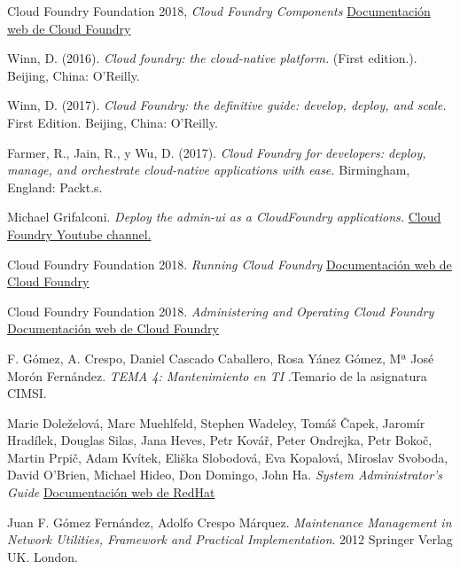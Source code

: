 \documentclass[a4paper,11pt]{article}
\begin{document}
\begin{thebibliography}{99}

Cloud Foundry Foundation 2018,
\textit{Cloud Foundry Components}
\href{https://docs.cloudfoundry.org/concepts/architecture/index.html}{Documentación web de Cloud Foundry}

Winn, D. (2016). \textit{Cloud foundry: the cloud-native platform.}
(First edition.). Beijing, China: O’Reilly.

Winn, D. (2017). \textit{Cloud Foundry: the definitive guide: develop, deploy, and scale.} First Edition. Beijing, China: O’Reilly.

Farmer, R., Jain, R., y Wu, D. (2017). \textit{Cloud Foundry for developers: deploy, manage, and orchestrate cloud-native applications with ease.} Birmingham, England: Packt.s.

Michael Grifalconi. \textit{Deploy the admin-ui as a CloudFoundry applications.}
\href{https://www.youtube.com/watch?v=9Np7swZN-4g}{Cloud Foundry Youtube channel.}

Cloud Foundry Foundation 2018.
\textit{Running Cloud Foundry}
\href{ https://docs.cloudfoundry.org/running/index.htm}{Documentación web de Cloud Foundry}

Cloud Foundry Foundation 2018.
\textit{Administering and Operating Cloud Foundry }
\href{https://docs.cloudfoundry.org/adminguide/}{Documentación web de Cloud Foundry}

F. Gómez, A. Crespo, Daniel Cascado Caballero, Rosa Yánez Gómez, Mª José Morón Fernández.
\textit{TEMA 4: Mantenimiento en TI}
.Temario de la asignatura CIMSI.

Marie Doleželová, Marc Muehlfeld, Stephen Wadeley, Tomáš Čapek, Jaromír Hradílek, Douglas Silas, Jana Heves, Petr Kovář, Peter Ondrejka, Petr Bokoč, Martin Prpič, Adam Kvítek, Eliška Slobodová, Eva Kopalová, Miroslav Svoboda, David O'Brien, Michael Hideo, Don Domingo, John Ha.
\textit{System Administrator's Guide} \href{https://access.redhat.com/documentation/en-US/Red_Hat_Enterprise_Linux/7/html-single/System_Administrators_Guide/}{Documentación web de RedHat}

Juan F. Gómez Fernández, Adolfo Crespo Márquez. \textit{Maintenance Management in Network Utilities, Framework and Practical Implementation}. 2012 Springer Verlag UK. London.

\end{thebibliography}
\end{document}
